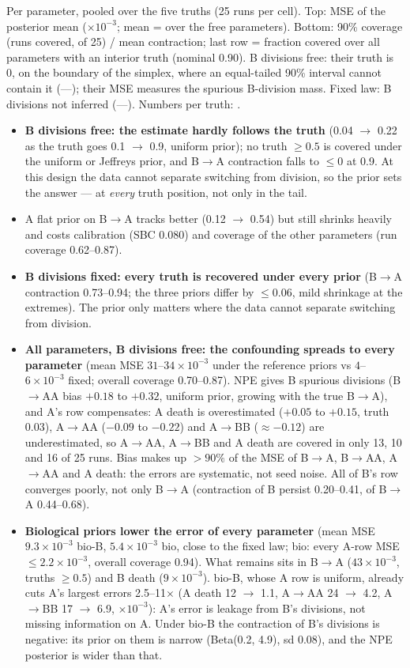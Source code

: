 \documentclass[10pt,a4paper]{article}
\newcommand{\res}[1]{\texttt{\detokenize{#1}}}  %
\newcommand{\blk}[1]{\par\needspace{5\baselineskip}\smallskip{\sffamily\bfseries\color{inkgray}#1}\par}
\newcommand{\Comment}{\blk{Comment}}
\renewcommand{\blk}[1]{\par\Needspace*{5\baselineskip}\smallskip{\sffamily\bfseries\color{inkgray}#1}\par}
\begin{document}
\begin{center}
Per parameter, pooled over the five truths (25 runs per cell). Top: MSE of the posterior mean ($\times 10^{-3}$; mean = over the free parameters). Bottom: 90\% coverage (runs covered, of 25) / mean contraction; last row = fraction covered over all parameters with an interior truth (nominal 0.90). B divisions free: their truth is 0, on the boundary of the simplex, where an equal-tailed 90\% interval cannot contain it (---); their MSE measures the spurious B-division mass. Fixed law: B divisions not inferred (---). Numbers per truth: \res{tables/x5a_params.csv}.
\end{center}
\Comment
\begin{itemize}
\item \textbf{B divisions free: the estimate hardly follows the truth} (0.04 $\to$ 0.22 as the truth goes 0.1 $\to$ 0.9, uniform prior); no truth $\ge 0.5$ is covered under the uniform or Jeffreys prior, and B$\to$A contraction falls to $\le 0$ at 0.9. At this design the data cannot separate switching from division, so the prior sets the answer --- at \emph{every} truth position, not only in the tail.
\item A flat prior on B$\to$A tracks better (0.12 $\to$ 0.54) but still shrinks heavily and costs calibration (SBC 0.080) and coverage of the other parameters (run coverage 0.62--0.87).
\item \textbf{B divisions fixed: every truth is recovered under every prior} (B$\to$A contraction 0.73--0.94; the three priors differ by $\le 0.06$, mild shrinkage at the extremes). The prior only matters where the data cannot separate switching from division.
\item \textbf{All parameters, B divisions free: the confounding spreads to every parameter} (mean MSE $31$--$34\times10^{-3}$ under the reference priors vs $4$--$6\times10^{-3}$ fixed; overall coverage 0.70--0.87). NPE gives B spurious divisions (B$\to$AA bias $+0.18$ to $+0.32$, uniform prior, growing with the true B$\to$A), and A's row compensates: A death is overestimated ($+0.05$ to $+0.15$, truth 0.03), A$\to$AA ($-0.09$ to $-0.22$) and A$\to$BB ($\approx -0.12$) are underestimated, so A$\to$AA, A$\to$BB and A death are covered in only 13, 10 and 16 of 25 runs. Bias makes up $>90\%$ of the MSE of B$\to$A, B$\to$AA, A$\to$AA and A death: the errors are systematic, not seed noise. All of B's row converges poorly, not only B$\to$A (contraction of B persist 0.20--0.41, of B$\to$A 0.44--0.68).
\item \textbf{Biological priors lower the error of every parameter} (mean MSE $9.3\times10^{-3}$ bio-B, $5.4\times10^{-3}$ bio, close to the fixed law; bio: every A-row MSE $\le 2.2\times10^{-3}$, overall coverage 0.94). What remains sits in B$\to$A ($43\times10^{-3}$, truths $\ge 0.5$) and B death ($9\times10^{-3}$). bio-B, whose A row is uniform, already cuts A's largest errors 2.5--11$\times$ (A death 12 $\to$ 1.1, A$\to$AA 24 $\to$ 4.2, A$\to$BB 17 $\to$ 6.9, $\times10^{-3}$): A's error is leakage from B's divisions, not missing information on A. Under bio-B the contraction of B's divisions is negative: its prior on them is narrow (Beta(0.2, 4.9), sd 0.08), and the NPE posterior is wider than that.

\end{itemize}
\end{document}
